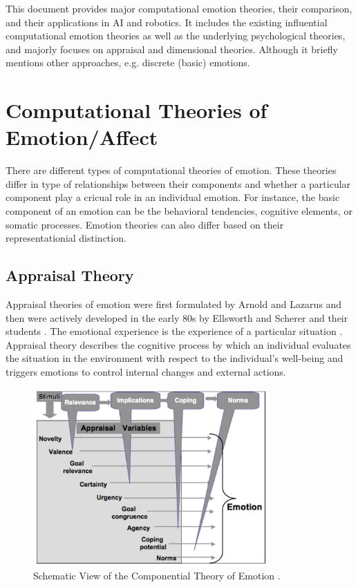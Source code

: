 \documentclass[11pt]{article}
\begin{document}
This document provides major computational emotion theories, their comparison,
and their applications in AI and robotics. It includes the existing influential
computational emotion theories as well as the underlying psychological theories,
and majorly focuses on appraisal and dimensional theories. Although it briefly
mentions other approaches, e.g. discrete (basic) emotions.

\section{Computational Theories of Emotion/Affect}
\label{sec:emotion-theories}

There are different types of computational theories of emotion. These theories
differ in type of relationships between their components and whether a
particular component play a cricual role in an individual emotion. For instance,
the basic component of an emotion can be the behavioral tendencies, cognitive
elements, or somatic processes. Emotion theories can also differ based on their
representationial distinction.

\subsection{Appraisal Theory}
\label{sec:appraisal-theory}

Appraisal theories of emotion were first formulated by Arnold
\cite{arnold:emotion-personality} and Lazarus \cite{lazarus:emotion-adaptation}
and then were actively developed in the early 80s by Ellsworth and Scherer and
their students \cite{roseman:appraisal-theory}
\cite{sander:systems-approach-appraisal} \cite{scherer:nature-function-emotion}
\cite{scherer:appraisal-processes} \cite{scherer:emotions-emergent}. The
emotional experience is the experience of a particular situation
\cite{frijda:emotions}. Appraisal theory describes the cognitive process by
which an individual evaluates the situation in the environment with respect to
the individual's well-being and triggers emotions to control internal changes
and external actions.

\begin{figure}[tbh]
  \center
  \includegraphics[width=0.8\textwidth]{figure/cpm.png}
  \caption{Schematic View of the Componential Theory of Emotion
  \cite{hudlicka:guidelines-emotions}.}
  \label{fig:cpm}
\end{figure}
\end{document}
